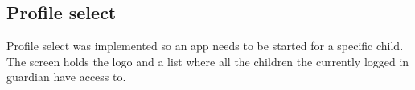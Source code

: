 \subsection{Profile select}
\label{backlog:profile_select}

Profile select was implemented so an app needs to be started for a specific child. The screen holds the \giraf[] logo and a list where all the children the currently logged in guardian have access to.